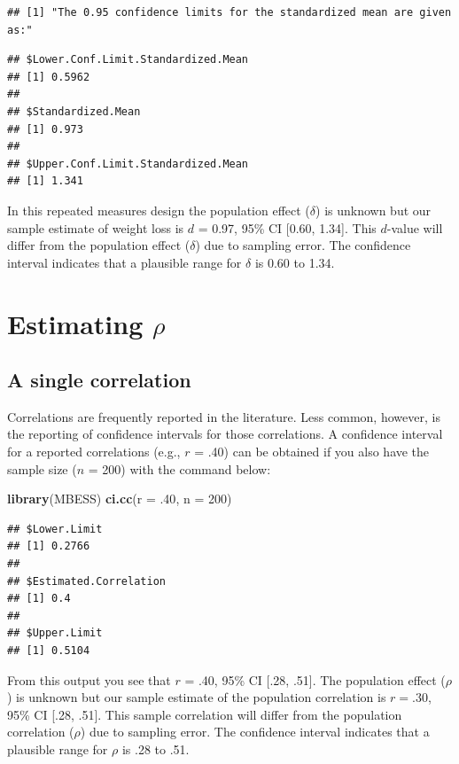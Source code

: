 \documentclass[
]{krantz}
\makeatletter
\newenvironment{Shaded}{\begin{snugshade}}{\end{snugshade}}
\newcommand{\DataTypeTok}[1]{\textcolor[rgb]{0.27,0.27,0.27}{#1}}
\newcommand{\DecValTok}[1]{\textcolor[rgb]{0.06,0.06,0.06}{#1}}
\newcommand{\FloatTok}[1]{\textcolor[rgb]{0.06,0.06,0.06}{#1}}
\newcommand{\KeywordTok}[1]{\textcolor[rgb]{0.27,0.27,0.27}{\textbf{#1}}}
\newcommand{\NormalTok}[1]{#1}
\newenvironment{kframe}{%
\medskip{}
\setlength{\fboxsep}{.8em}
 \def\at@end@of@kframe{}%
 \ifinner\ifhmode%
  \def\at@end@of@kframe{\end{minipage}}%
  \begin{minipage}{\columnwidth}%
 \fi\fi%
 \def\FrameCommand##1{\hskip\@totalleftmargin \hskip-\fboxsep
 \colorbox{shadecolor}{##1}\hskip-\fboxsep
     \hskip-\linewidth \hskip-\@totalleftmargin \hskip\columnwidth}%
 \MakeFramed {\advance\hsize-\width
   \@totalleftmargin\z@ \linewidth\hsize
   \@setminipage}}%
 {\par\unskip\endMakeFramed%
 \at@end@of@kframe}
\renewenvironment{Shaded}{\begin{kframe}}{\end{kframe}}
\makeatother
\begin{document}
\begin{verbatim}
## [1] "The 0.95 confidence limits for the standardized mean are given as:"
\end{verbatim}

\begin{verbatim}
## $Lower.Conf.Limit.Standardized.Mean
## [1] 0.5962
## 
## $Standardized.Mean
## [1] 0.973
## 
## $Upper.Conf.Limit.Standardized.Mean
## [1] 1.341
\end{verbatim}

In this repeated measures design the population effect (\(\delta\)) is unknown but our sample estimate of weight loss is \(d\) = 0.97, 95\% CI {[}0.60, 1.34{]}. This \(d\)-value will differ from the population effect (\(\delta\)) due to sampling error. The confidence interval indicates that a plausible range for \(\delta\) is 0.60 to 1.34.

\hypertarget{estimating-rho-1}{%
\section{\texorpdfstring{Estimating \(\rho\)}{Estimating \textbackslash rho}}\label{estimating-rho-1}}

\hypertarget{a-single-correlation}{%
\subsection{A single correlation}\label{a-single-correlation}}

Correlations are frequently reported in the literature. Less common, however, is the reporting of confidence intervals for those correlations. A confidence interval for a reported correlations (e.g., \(r\) = .40) can be obtained if you also have the sample size (\(n\) = 200) with the command below:

\begin{Shaded}
\begin{Highlighting}[]
\KeywordTok{library}\NormalTok{(MBESS)}
\KeywordTok{ci.cc}\NormalTok{(}\DataTypeTok{r =} \FloatTok{.40}\NormalTok{, }\DataTypeTok{n =} \DecValTok{200}\NormalTok{)}
\end{Highlighting}
\end{Shaded}

\begin{verbatim}
## $Lower.Limit
## [1] 0.2766
## 
## $Estimated.Correlation
## [1] 0.4
## 
## $Upper.Limit
## [1] 0.5104
\end{verbatim}

From this output you see that \(r\) = .40, 95\% CI {[}.28, .51{]}. The population effect (\(\rho\)) is unknown but our sample estimate of the population correlation is \(r = .30\), 95\% CI {[}.28, .51{]}. This sample correlation will differ from the population correlation (\(\rho\)) due to sampling error. The confidence interval indicates that a plausible range for \(\rho\) is .28 to .51.
\end{document}
